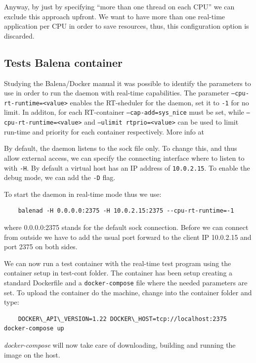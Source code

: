 \documentclass[]{scrartcl}
\begin{document}
Anyway, by just by specifying ``more than one thread on each CPU'' we can exclude this approach upfront. We want to have more than one real-time application per CPU in order to save resources, thus, this configuration option is discarded.

\subsection{Tests Balena container}

Studying the Balena/Docker manual it was possible to identify the parameters to use in order to run the daemon with real-time capabilities. The parameter \texttt{--cpu-rt-runtime=<value>} enables the RT-sheduler for the daemon, set it to \texttt{-1} for no limit. In additon, for each RT-container \texttt{--cap-add=sys\_nice} must be set, while \texttt{--cpu-rt-runtime=<value>} and \texttt{--ulimit rtprio=<value>} can be used to limit run-time and priority for each container respectively.
More info at \cite{docker06}

By default, the daemon listens to the sock file only. To change this, and thus allow external access, we can specify the connecting interface where to listen to with \texttt{-H}. By default a virtual host has an IP address of \texttt{10.0.2.15}. To enable the debug mode, we can add the \texttt{-D} flag.

To start the daemon in real-time mode thus we use:

\begin{verbatim}
	balenad -H 0.0.0.0:2375 -H 10.0.2.15:2375 --cpu-rt-runtime=-1
\end{verbatim}

where 0.0.0.0:2375 stands for the default sock connection. Before we can connect from outside we have to add the usual port forward to the client IP 10.0.2.15 and port 2375 on both sides.

We can now run a test container with the real-time test program using the container setup in test-cont folder. The container has been setup creating a standard Dockerfile and a \texttt{docker-compose} file where the needed parameters are set. To upload the container do the machine, change into the container folder and type:

\begin{verbatim}
	DOCKER\_API\_VERSION=1.22 DOCKER\_HOST=tcp://localhost:2375 docker-compose up
\end{verbatim}

\textit{docker-compose} will now take care of downloading, building and running the image on the host.
\end{document}
